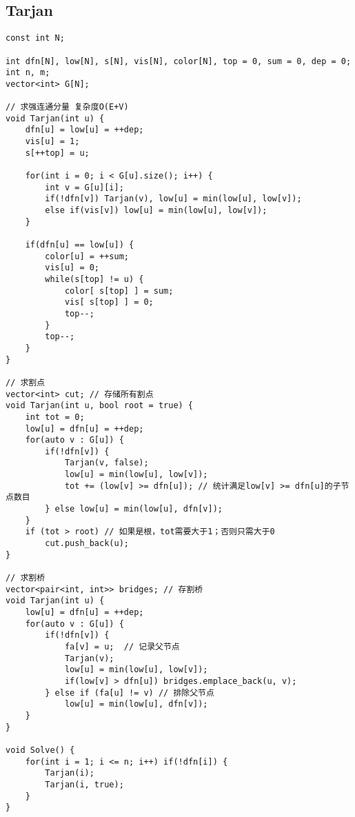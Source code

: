 \subsection{Tarjan}
\begin{lstlisting}
const int N;

int dfn[N], low[N], s[N], vis[N], color[N], top = 0, sum = 0, dep = 0;
int n, m;
vector<int> G[N];

// 求强连通分量 复杂度O(E+V)
void Tarjan(int u) {
	dfn[u] = low[u] = ++dep;
	vis[u] = 1;
	s[++top] = u;
	
	for(int i = 0; i < G[u].size(); i++) {
		int v = G[u][i];
		if(!dfn[v]) Tarjan(v), low[u] = min(low[u], low[v]);
		else if(vis[v]) low[u] = min(low[u], low[v]);
	}
	
	if(dfn[u] == low[u]) {
		color[u] = ++sum;
		vis[u] = 0;
		while(s[top] != u) {
			color[ s[top] ] = sum;
			vis[ s[top] ] = 0;
			top--;
		}
		top--;
	}
}

// 求割点
vector<int> cut; // 存储所有割点
void Tarjan(int u, bool root = true) {
	int tot = 0;
	low[u] = dfn[u] = ++dep;
	for(auto v : G[u]) {
		if(!dfn[v]) {
			Tarjan(v, false);
			low[u] = min(low[u], low[v]);
			tot += (low[v] >= dfn[u]); // 统计满足low[v] >= dfn[u]的子节点数目
		} else low[u] = min(low[u], dfn[v]);
	}
	if (tot > root) // 如果是根，tot需要大于1；否则只需大于0
        cut.push_back(u);
}

// 求割桥
vector<pair<int, int>> bridges;	// 存割桥
void Tarjan(int u) {
	low[u] = dfn[u] = ++dep;
	for(auto v : G[u]) {
		if(!dfn[v]) {
			fa[v] = u;	// 记录父节点
			Tarjan(v);
			low[u] = min(low[u], low[v]);
			if(low[v] > dfn[u]) bridges.emplace_back(u, v);
		} else if (fa[u] != v) // 排除父节点
            low[u] = min(low[u], dfn[v]);
	}
}

void Solve() {
	for(int i = 1; i <= n; i++) if(!dfn[i]) {
		Tarjan(i);
		Tarjan(i, true);
	}
}
\end{lstlisting}


